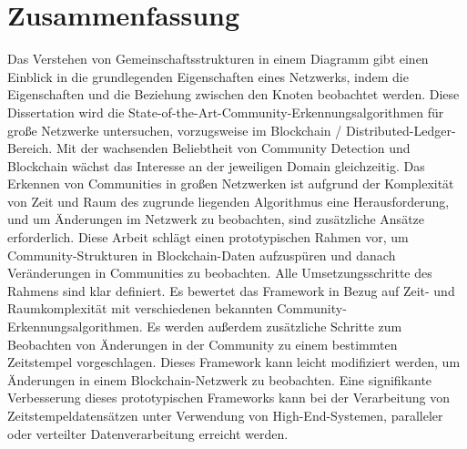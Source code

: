 \chapter*{Zusammenfassung}
\label{cha:zusammenfassung}

Das Verstehen von Gemeinschaftsstrukturen in einem Diagramm gibt einen Einblick in die grundlegenden Eigenschaften eines Netzwerks, indem die Eigenschaften und die Beziehung zwischen den Knoten beobachtet werden. Diese Dissertation wird die State-of-the-Art-Community-Erkennungsalgorithmen für große Netzwerke untersuchen, vorzugsweise im Blockchain / Distributed-Ledger-Bereich. Mit der wachsenden Beliebtheit von Community Detection und Blockchain wächst das Interesse an der jeweiligen Domain gleichzeitig. Das Erkennen von Communities in großen Netzwerken ist aufgrund der Komplexität von Zeit und Raum des zugrunde liegenden Algorithmus eine Herausforderung, und um Änderungen im Netzwerk zu beobachten, sind zusätzliche Ansätze erforderlich. Diese Arbeit schlägt einen prototypischen Rahmen vor, um Community-Strukturen in Blockchain-Daten aufzuspüren und danach Veränderungen in Communities zu beobachten. Alle Umsetzungsschritte des Rahmens sind klar definiert. Es bewertet das Framework in Bezug auf Zeit- und Raumkomplexität mit verschiedenen bekannten Community-Erkennungsalgorithmen. Es werden außerdem zusätzliche Schritte zum Beobachten von Änderungen in der Community zu einem bestimmten Zeitstempel vorgeschlagen. Dieses Framework kann leicht modifiziert werden, um Änderungen in einem Blockchain-Netzwerk zu beobachten. Eine signifikante Verbesserung dieses prototypischen Frameworks kann bei der Verarbeitung von Zeitstempeldatensätzen unter Verwendung von High-End-Systemen, paralleler oder verteilter Datenverarbeitung erreicht werden.
